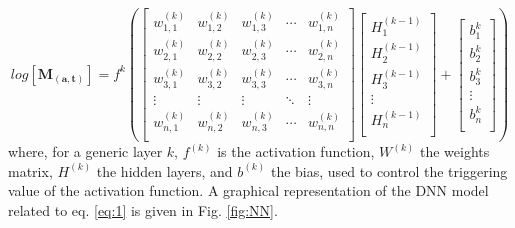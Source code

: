 \documentclass[a4,11pt]{article}
\begin{document}
\begin{equation}
log[\mathbf{M_{(a,t)}}] =
f^{k} \left(
\begin{bmatrix}
w^{(k)}_{1,1} & w^{(k)}_{1,2} &w^{(k)}_{1,3} & \cdots & w^{(k)}_{1,n} \\
w^{(k)}_{2,1} & w^{(k)}_{2,2} &w^{(k)}_{2,3} & \cdots & w^{(k)}_{2,n} \\
w^{(k)}_{3,1} & w^{(k)}_{3,2} &w^{(k)}_{3,3} & \cdots & w^{(k)}_{3,n} \\
\vdots  & \vdots  & \vdots & \ddots & \vdots  \\
w^{(k)}_{n,1} & w^{(k)}_{n,2} &w^{(k)}_{n,3} & \cdots & w^{(k)}_{n,n} \\
\end{bmatrix}
\begin{bmatrix}
H^{(k-1)}_{1} \\
H^{(k-1)}_{2} \\
H^{(k-1)}_{3} \\
\vdots     \\
H^{(k-1)}_{n} \\
\end{bmatrix}
+
\begin{bmatrix}
b^{k}_{1}\\
b^{k}_{2} \\
b^{k}_{3} \\
\vdots     \\
b^{k}_{n} \\
\end{bmatrix}
\right)
\label{eq:1}
\end{equation}
where, for a generic layer $k$, $f^{(k)}$ is the activation function, $W^{(k)}$ the weights matrix, $H^{(k)}$ the hidden layers, and $b^{(k)}$ the bias, used to control the triggering value of the activation function.
A graphical representation of the DNN model related to eq. \ref{eq:1} is given in Fig. \ref{fig:NN}.
\end{document}
